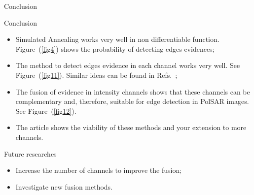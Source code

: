 \documentclass[10pt,professionalfonts]{beamer}
\begin{document}
\begin{frame}[fragile]{Conclusion}
\begin{alertblock}{Conclusion}
\begin{itemize}
	\item Simulated Annealing works very well in non differentiable function. Figure~(\ref{fig4}) shows the probability of detecting edges evidences;
	\item The method to detect edges evidence in each channel works very well. See Figure~(\ref{fig11}). Similar ideas can be found in  Refs.~\cite{fbgm,nhfc};
	\item The fusion of evidence in intensity channels shows that these channels can be complementary and, therefore, suitable for edge detection in PolSAR images. See Figure~(\ref{fig12}).
	\item The article shows the viability of these methods and your extension to more channels.
\end{itemize}
\end{alertblock}
\begin{alertblock}{Future researches}	
\begin{itemize}
	\item Increase the number of channels to improve the fusion;
	\item Investigate new fusion methods.
\end{itemize}
\end{alertblock}
\end{frame}

\begin{frame}[allowframebreaks]


\end{frame}
\end{document}
